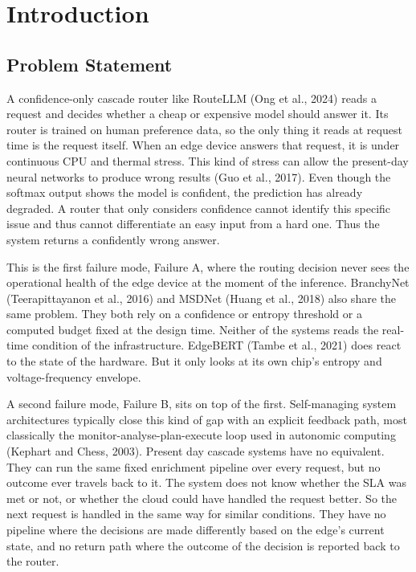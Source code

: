 \hypertarget{introduction}{%
\section{Introduction}\label{introduction}}

\hypertarget{problem-statement}{%
\subsection{Problem Statement}\label{problem-statement}}

A confidence-only cascade router like RouteLLM (Ong et al., 2024) reads
a request and decides whether a cheap or expensive model should answer
it. Its router is trained on human preference data, so the only thing it
reads at request time is the request itself. When an edge device answers
that request, it is under continuous CPU and thermal stress. This kind
of stress can allow the present-day neural networks to produce wrong
results (Guo et al., 2017). Even though the softmax output shows the
model is confident, the prediction has already degraded. A router that
only considers confidence cannot identify this specific issue and thus
cannot differentiate an easy input from a hard one. Thus the system
returns a confidently wrong answer.

This is the first failure mode, Failure A, where the routing decision
never sees the operational health of the edge device at the moment of
the inference. BranchyNet (Teerapittayanon et al., 2016) and MSDNet
(Huang et al., 2018) also share the same problem. They both rely on a
confidence or entropy threshold or a computed budget fixed at the design
time. Neither of the systems reads the real-time condition of the
infrastructure. EdgeBERT (Tambe et al., 2021) does react to the state of
the hardware. But it only looks at its own chip's entropy and
voltage-frequency envelope.

A second failure mode, Failure B, sits on top of the first. Self-managing
system architectures typically close this kind of gap with an explicit
feedback path, most classically the monitor-analyse-plan-execute loop
used in autonomic computing (Kephart and Chess, 2003). Present day
cascade systems have no equivalent. They can run the same fixed
enrichment pipeline over every request, but no outcome ever travels
back to it. The system does not
know whether the SLA was met or not, or whether the cloud could have
handled the request better. So the next request is handled in the same
way for similar conditions. They have no pipeline where the decisions
are made differently based on the edge's current state, and no return
path where the outcome of the decision is reported back to the router.

